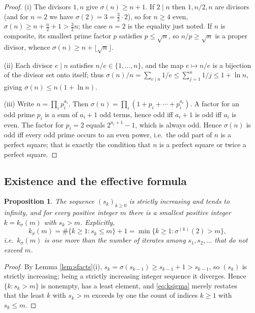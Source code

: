 \documentclass{amsart}
\newtheorem{proposition}{Proposition}
\theoremstyle{definition}
\begin{document}
\begin{proof}
(i) The divisors $1,n$ give $\sigma(n)\ge n+1$. If $2\mid n$ then $1,n/2,n$ are
divisors (and for $n=2$ we have $\sigma(2)=3=\tfrac32\cdot2$), so for $n\ge4$
even, $\sigma(n)\ge n+\tfrac n2+1>\tfrac32 n$; the case $n=2$ is the equality
just noted. If $n$ is composite, its smallest prime factor $p$ satisfies
$p\le\sqrt n$, so $n/p\ge\sqrt n$ is a proper divisor, whence
$\sigma(n)\ge n+\lfloor\sqrt n\rfloor$.

(ii) Each divisor $e\mid n$ satisfies $n/e\in\{1,\dots,n\}$, and the map
$e\mapsto n/e$ is a bijection of the divisor set onto itself; thus
$\sigma(n)/n=\sum_{e\mid n}1/e\le\sum_{j=1}^{n}1/j\le 1+\ln n$, giving
$\sigma(n)\le n(1+\ln n)$.

(iii) Write $n=\prod_i p_i^{a_i}$. Then
$\sigma(n)=\prod_i(1+p_i+\cdots+p_i^{a_i})$. A factor for an odd prime $p_i$
is a sum of $a_i+1$ odd terms, hence odd iff $a_i+1$ is odd iff $a_i$ is even.
The factor for $p_i=2$ equals $2^{a_i+1}-1$, which is always odd. Hence
$\sigma(n)$ is odd iff every odd prime occurs to an even power, i.e.\ the odd
part of $n$ is a perfect square; that is exactly the condition that $n$ is a
perfect square or twice a perfect square.
\end{proof}

\subsection{Existence and the effective formula}

\begin{proposition}\label{prop:exist}
The sequence $(s_k)_{k\ge0}$ is strictly increasing and tends to infinity, and
for every positive integer $m$ there is a smallest positive integer
$k=k_\sigma(m)$ with $s_k>m$. Explicitly,
\begin{equation}\label{eq:ksigma}
k_\sigma(m)=\#\{k\ge1: s_{k}\le m\}+1=\min\{k\ge1:\sigma^{(k)}(2)>m\},
\end{equation}
i.e.\ $k_\sigma(m)$ is one more than the number of iterates among
$s_1,s_2,\dots$ that do not exceed $m$.
\end{proposition}

\begin{proof}
By Lemma \ref{lem:sfacts}(i), $s_k=\sigma(s_{k-1})\ge s_{k-1}+1>s_{k-1}$, so
$(s_k)$ is strictly increasing; being a strictly increasing integer sequence it
diverges. Hence $\{k:s_k>m\}$ is nonempty, has a least element, and
\eqref{eq:ksigma} merely restates that the least $k$ with $s_k>m$ exceeds by
one the count of indices $k\ge1$ with $s_k\le m$.
\end{proof}
\end{document}
